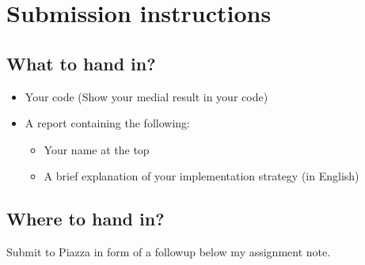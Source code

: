 \documentclass[12pt]{article}
\begin{document}
\section{Submission instructions}

\subsection{What to hand in?}

\begin{itemize}
\item Your code (Show your medial result in your code)
\item A report containing the following:
\begin{itemize}
\item Your name at the top
\item A brief explanation of your implementation strategy (in English)
\end{itemize}
\end{itemize}

\subsection{Where to hand in?}

Submit to Piazza in form of a followup below my assignment note.





%
%
% 

\end{document}
